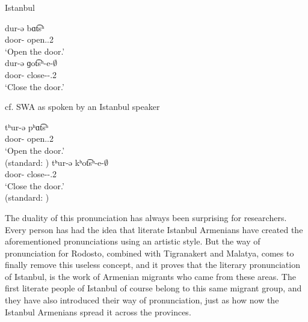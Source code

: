 \begin{exe}
	\ex \begin{xlist}
		\ex Istanbul \label{sent:Rodosto:phono:change:cons:voice:Istanbul}
		\begin{xlist}
			\ex \gll dur-ə bɑt͡sʰ \\
			door-{} open.{\imp}.2{\sg} \\
			\trans `Open the door.'\\
			\ex \gll dur-ə ɡot͡sʰ-e-$\emptyset$ \\
			door-{} close-{\thgloss}-{\imp}.2{\sg} \\
			\trans `Close the door.'\\
		\end{xlist}
		\ex cf. SWA as spoken by an Istanbul speaker \label{sent:Rodosto:phono:change:cons:voice:swa}
		\begin{xlist}
			\ex \gll tʰur-ə pʰɑt͡sʰ \\
			door-{} open.{\imp}.2{\sg} \\
			\trans `Open the door.'\\
			 (standard: \armenian{դուռը բաց})
			\ex \gll tʰur-ə kʰot͡sʰ-e-$\emptyset$ \\
			door-{} close-{\thgloss}-{\imp}.2{\sg} \\
			\trans `Close the door.'\\
			 (standard: \armenian{դուռը գոցէ})
		\end{xlist}

	\end{xlist}
	
\end{exe}


 

The duality of this pronunciation has always been surprising for researchers. Every person has had the idea that literate Istanbul Armenians have created the aforementioned pronunciations using an artistic style. But the way of pronunciation for Rodosto, combined with Tigranakert and  Malatya, comes to finally remove this useless concept, and it proves that the literary pronunciation of Istanbul, is the work of Armenian migrants who came from these areas. The first literate people of Istanbul of course belong to this same migrant group, and they have also introduced their way of pronunciation, just as how now the Istanbul Armenians spread it across the provinces.

